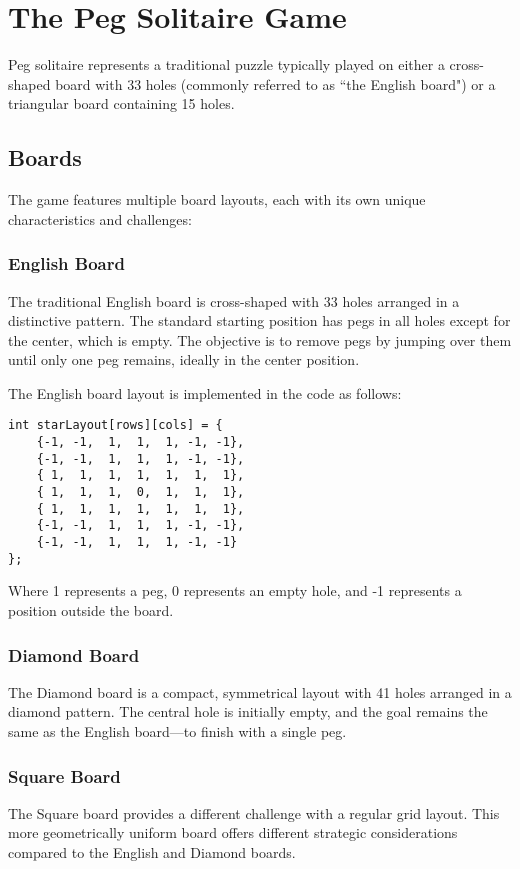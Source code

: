 \section{The Peg Solitaire Game}
\label{sec:peg-solitaire-game}

Peg solitaire represents a traditional puzzle typically played on either a cross-shaped board with 33 holes (commonly referred to as ``the English board") or a triangular board containing 15 holes.\cite{Bell_2006}

\subsection{Boards}
The game features multiple board layouts, each with its own unique characteristics and challenges:

\subsubsection{English Board}
The traditional English board is cross-shaped with 33 holes arranged in a distinctive pattern. The standard starting position has pegs in all holes except for the center, which is empty. The objective is to remove pegs by jumping over them until only one peg remains, ideally in the center position.

The English board layout is implemented in the code as follows:
\begin{verbatim}
int starLayout[rows][cols] = {
    {-1, -1,  1,  1,  1, -1, -1},
    {-1, -1,  1,  1,  1, -1, -1},
    { 1,  1,  1,  1,  1,  1,  1},
    { 1,  1,  1,  0,  1,  1,  1},
    { 1,  1,  1,  1,  1,  1,  1},
    {-1, -1,  1,  1,  1, -1, -1},
    {-1, -1,  1,  1,  1, -1, -1}
};
\end{verbatim}
Where 1 represents a peg, 0 represents an empty hole, and -1 represents a position outside the board.

\subsubsection{Diamond Board}
The Diamond board is a compact, symmetrical layout with 41 holes arranged in a diamond pattern. The central hole is initially empty, and the goal remains the same as the English board—to finish with a single peg.

\subsubsection{Square Board}
The Square board provides a different challenge with a regular grid layout. This more geometrically uniform board offers different strategic considerations compared to the English and Diamond boards.

